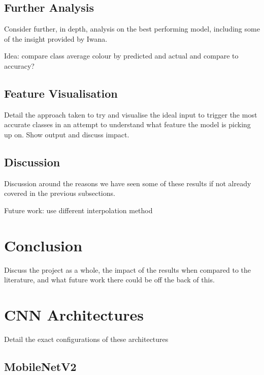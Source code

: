 \documentclass[12pt]{article}
\numberwithin{equation}{section}
\numberwithin{figure}{section}
\begin{document}
\subsection{Further Analysis} 
\label{sub:Further_Analysis} 
Consider further, in depth, analysis on the best performing model, including some of the insight provided by Iwana.

Idea: compare class average colour by predicted and actual and compare to accuracy?
\subsection{Feature Visualisation} 
\label{sub:Feature_Visualisation} 
Detail the approach taken to try and visualise the ideal input to trigger the most accurate classes in an attempt to understand what feature the model is picking up on. Show output and discuss impact.

\subsection{Discussion} 
\label{sub:Discussion} 
Discussion around the reasons we have seen some of these results if not already covered in the previous subsections. 

Future work:
use different interpolation method

\section{Conclusion} 
\label{sec:Conclusion} 
Discuss the project as a whole, the impact of the results when compared to the literature, and what future work there could be off the back of this.




 

\appendix

\section{CNN Architectures} 
\label{sec:CNN_Architectures} 
Detail the exact configurations of these architectures
\subsection{MobileNetV2} 
\label{sub:MobileNetV2} 
 
\end{document}
